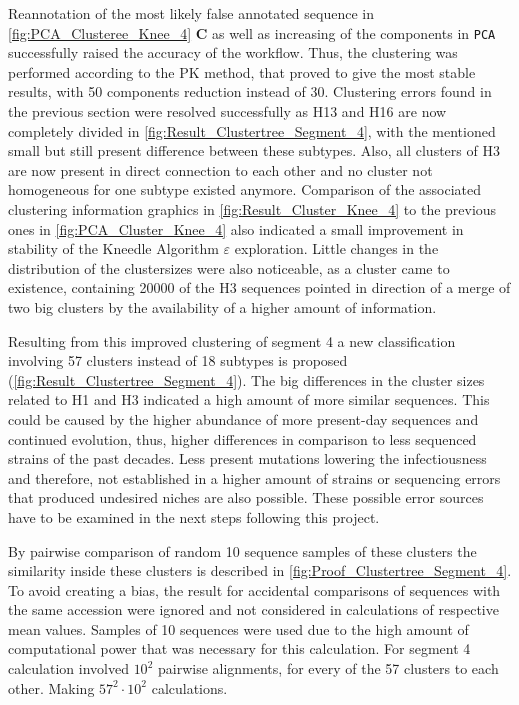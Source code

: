 Reannotation of the most likely false annotated sequence in \autoref{fig:PCA_Clusteree_Knee_4} \textbf{\textsf{C}} as well as increasing of the components in \texttt{PCA} successfully raised the accuracy of the workflow. Thus, the clustering was performed according to the PK method, that proved to give the most stable results, with 50 components reduction instead of 30. Clustering errors found in the previous section were resolved successfully as H13 and H16 are now completely divided in \autoref{fig:Result_Clustertree_Segment_4}, with the mentioned small but still present difference between these subtypes. Also, all clusters of H3 are now present in direct connection to each other and no cluster not homogeneous for one subtype existed anymore. Comparison of the associated clustering information graphics in \autoref{fig:Result_Cluster_Knee_4} to the previous ones in \autoref{fig:PCA_Cluster_Knee_4} also indicated a small improvement in stability of the Kneedle Algorithm $\varepsilon$ exploration. Little changes in the distribution of the clustersizes were also noticeable, as a cluster came to existence, containing 20000 of the H3 sequences pointed in direction of a merge of two big clusters by the availability of a higher amount of information.  

\newpage

Resulting from this improved clustering of segment 4 a new classification involving 57 clusters instead of 18 subtypes is proposed (\autoref{fig:Result_Clustertree_Segment_4}). The big differences in the cluster sizes related to H1 and H3 indicated a high amount of more similar sequences. This could be caused by the higher abundance of more present-day sequences and continued evolution, thus, higher differences in comparison to less sequenced strains of the past decades. Less present mutations lowering the infectiousness and therefore, not established in a higher amount of strains or sequencing errors that produced undesired niches are also possible. These possible error sources have to be examined in the next steps following this project.

\vspace{1em}

By pairwise comparison of random 10 sequence samples of these clusters the similarity inside these clusters is described in \autoref{fig:Proof_Clustertree_Segment_4}. To avoid creating a bias, the result for accidental comparisons of sequences with the same accession were ignored and not considered in calculations of respective mean values. Samples of 10 sequences were used due to the high amount of computational power that was necessary for this calculation. For segment 4 calculation involved $10^2$ pairwise alignments, for every of the 57 clusters to each other. Making $57^2\cdot 10^2$ calculations.

